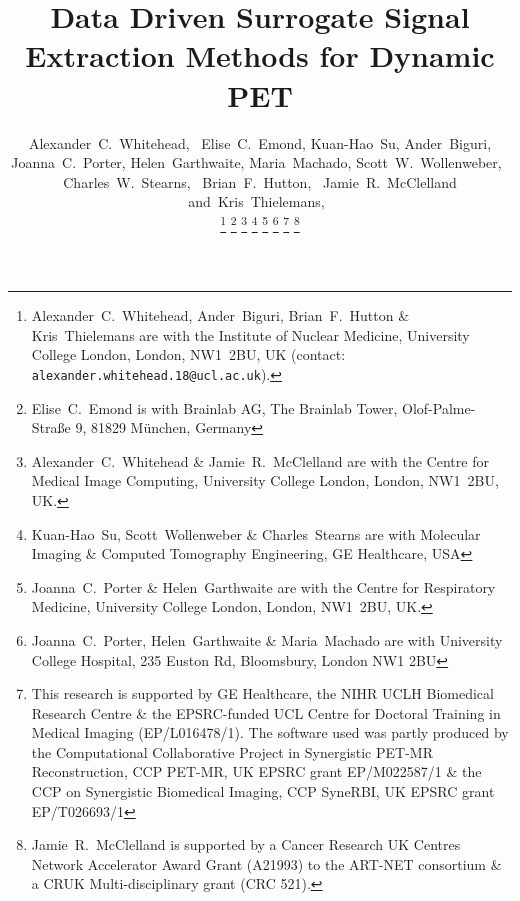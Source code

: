 \documentclass[10pt, twocolumn, twoside, letterpaper]{IEEEtran}
\begin{document}
\title{Data Driven Surrogate Signal Extraction Methods for Dynamic PET}

\pagestyle{plain}

\author{Alexander~C.~Whitehead,~
        Elise~C.~Emond,
        Kuan-Hao~Su,
        Ander~Biguri,
        Joanna~C.~Porter,
        Helen~Garthwaite,
        Maria~Machado,
        Scott~W.~Wollenweber,~
        Charles~W.~Stearns,~
        Brian~F.~Hutton,~
        Jamie~R.~McClelland
        and~Kris~Thielemans,~%

    \thanks{Alexander~C.~Whitehead, Ander~Biguri, Brian~F.~Hutton \& Kris~Thielemans are with the Institute of Nuclear Medicine, University College London, London, NW1~2BU, UK (contact: \texttt{alexander.whitehead.18@ucl.ac.uk}).}%
    \thanks{Elise~C.~Emond is with Brainlab AG, The Brainlab Tower, Olof-Palme-Straße 9, 81829 München, Germany}
    \thanks{Alexander~C.~Whitehead \& Jamie~R.~McClelland are with the Centre for Medical Image Computing, University College London, London, NW1~2BU, UK.}%
    \thanks{Kuan-Hao~Su, Scott~Wollenweber \& Charles~Stearns are with Molecular Imaging \& Computed Tomography Engineering, GE Healthcare, USA}%
    \thanks{Joanna~C.~Porter \& Helen~Garthwaite are with the Centre for Respiratory Medicine, University College London, London, NW1~2BU, UK.}%
    \thanks{Joanna~C.~Porter, Helen~Garthwaite \& Maria~Machado are with University College Hospital, 235 Euston Rd, Bloomsbury, London NW1 2BU}%
    \thanks{This research is supported by GE Healthcare, the NIHR UCLH Biomedical Research Centre \& the EPSRC-funded UCL Centre for Doctoral Training in Medical Imaging (EP/L016478/1). The software used was partly produced by the Computational Collaborative Project in Synergistic PET-MR Reconstruction, CCP PET-MR, UK EPSRC grant EP/M022587/1 \& the CCP on Synergistic Biomedical Imaging, CCP SyneRBI, UK EPSRC grant EP/T026693/1}%
    \thanks{Jamie~R.~McClelland is supported by a Cancer Research UK Centres Network Accelerator Award Grant (A21993) to the ART-NET consortium \& a CRUK Multi-disciplinary grant (CRC 521).}%
}

\maketitle
\IEEEpeerreviewmaketitle
\end{document}
